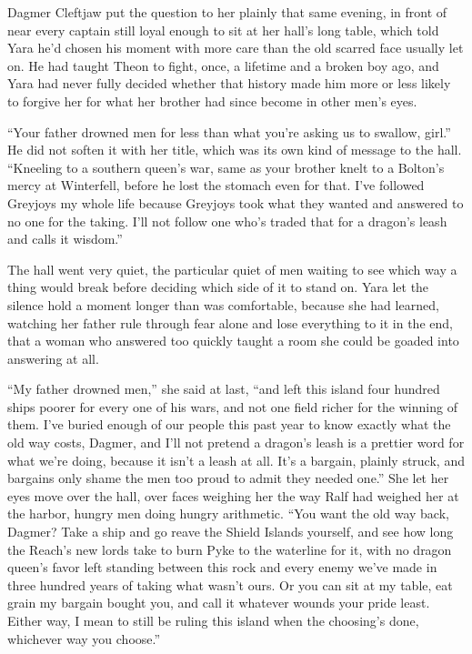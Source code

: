 \sceneBreak

Dagmer Cleftjaw put the question to her plainly that same evening, in front of near every captain still loyal enough to sit at her hall’s long table, which told Yara he’d chosen his moment with more care than the old scarred face usually let on. He had taught Theon to fight, once, a lifetime and a broken boy ago, and Yara had never fully decided whether that history made him more or less likely to forgive her for what her brother had since become in other men’s eyes.

“Your father drowned men for less than what you’re asking us to swallow, girl.” He did not soften it with her title, which was its own kind of message to the hall. “Kneeling to a southern queen’s war, same as your brother knelt to a Bolton’s mercy at Winterfell, before he lost the stomach even for that. I’ve followed Greyjoys my whole life because Greyjoys took what they wanted and answered to no one for the taking. I’ll not follow one who’s traded that for a dragon’s leash and calls it wisdom.”

The hall went very quiet, the particular quiet of men waiting to see which way a thing would break before deciding which side of it to stand on. Yara let the silence hold a moment longer than was comfortable, because she had learned, watching her father rule through fear alone and lose everything to it in the end, that a woman who answered too quickly taught a room she could be goaded into answering at all.

“My father drowned men,” she said at last, “and left this island four hundred ships poorer for every one of his wars, and not one field richer for the winning of them. I’ve buried enough of our people this past year to know exactly what the old way costs, Dagmer, and I’ll not pretend a dragon’s leash is a prettier word for what we’re doing, because it isn’t a leash at all. It’s a bargain, plainly struck, and bargains only shame the men too proud to admit they needed one.” She let her eyes move over the hall, over faces weighing her the way Ralf had weighed her at the harbor, hungry men doing hungry arithmetic. “You want the old way back, Dagmer? Take a ship and go reave the Shield Islands yourself, and see how long the Reach’s new lords take to burn Pyke to the waterline for it, with no dragon queen’s favor left standing between this rock and every enemy we’ve made in three hundred years of taking what wasn’t ours. Or you can sit at my table, eat grain my bargain bought you, and call it whatever wounds your pride least. Either way, I mean to still be ruling this island when the choosing’s done, whichever way you choose.”

